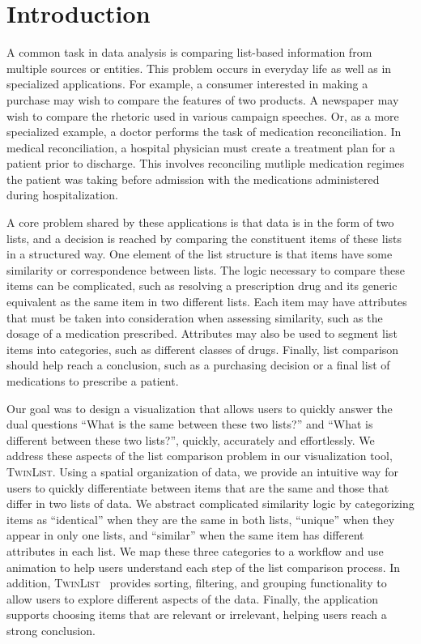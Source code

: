 \documentclass{chi2009}
\newcommand{\TwinList}{\textsc{TwinList}}
\begin{document}


\section{Introduction}
A common task in data analysis is comparing list-based information from multiple sources or entities. This problem occurs in everyday life as well as in specialized applications. For example, a consumer interested in making a purchase may wish to compare the features of two products. A newspaper may wish to compare the rhetoric used in various campaign speeches. Or, as a more specialized example, a doctor performs the task of medication reconciliation. In medical reconciliation, a hospital physician must create a treatment plan for a patient prior to discharge. This involves reconciling mutliple medication regimes the patient was taking before admission with the medications administered during hospitalization. 

A core problem shared by these applications is that data is in the form of two lists, and a decision is reached by comparing the constituent items of these lists in a structured way. One element of the list structure is that items have some similarity or correspondence between lists. The logic necessary to compare these items can be complicated, such as resolving a prescription drug and its generic equivalent as the same item in two different lists. Each item may have attributes that must be taken into consideration when assessing similarity, such as the dosage of a medication prescribed. Attributes may also be used to segment list items into categories, such as different classes of drugs. Finally, list comparison should help reach a conclusion, such as a purchasing decision or a final list of medications to prescribe a patient.

Our goal was to design a visualization that allows users to quickly answer the dual questions ``What is the same between these two lists?'' and ``What is different between these two lists?'', quickly, accurately and effortlessly. We address these aspects of the list comparison problem in our visualization tool, \TwinList. Using a spatial organization of data, we provide an intuitive way for users to quickly differentiate between items that are the same and those that differ in two lists of data. We abstract complicated similarity logic by categorizing items as ``identical'' when they are the same in both lists, ``unique'' when they appear in only one lists, and ``similar'' when the same item has different attributes in each list. We map these three categories to a workflow and use animation to help users understand each step of the list comparison process. In addition, \TwinList~ provides sorting, filtering, and grouping functionality to allow users to explore different aspects of the data. Finally, the application supports choosing items that are relevant or irrelevant, helping users reach a strong conclusion. 
\end{document}
